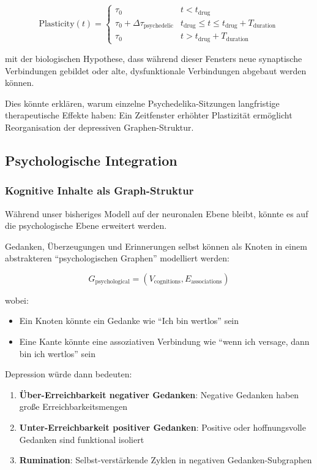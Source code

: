 \documentclass[a4paper,12pt]{article}
\theoremstyle{definition}
\begin{document}
\begin{equation}
\text{Plasticity}(t) = \begin{cases}
\tau_0 & t < t_{\text{drug}} \\
\tau_0 + \Delta \tau_{\text{psychedelic}} & t_{\text{drug}} \leq t \leq t_{\text{drug}} + T_{\text{duration}} \\
\tau_0 & t > t_{\text{drug}} + T_{\text{duration}}
\end{cases}
\end{equation}

mit der biologischen Hypothese, dass während dieser Fensters neue synaptische Verbindungen gebildet oder alte, dysfunktionale Verbindungen abgebaut werden können.

Dies könnte erklären, warum einzelne Psychedelika-Sitzungen langfristige therapeutische Effekte haben: Ein Zeitfenster erhöhter Plastizität ermöglicht Reorganisation der depressiven Graphen-Struktur.

\subsection{Psychologische Integration}

\subsubsection{Kognitive Inhalte als Graph-Struktur}

Während unser bisheriges Modell auf der neuronalen Ebene bleibt, könnte es auf die psychologische Ebene erweitert werden.

Gedanken, Überzeugungen und Erinnerungen selbst können als Knoten in einem abstrakteren ``psychologischen Graphen'' modelliert werden:

\begin{equation}
G_{\text{psychological}} = (V_{\text{cognitions}}, E_{\text{associations}})
\end{equation}

wobei:
\begin{itemize}
	\item Ein Knoten könnte ein Gedanke wie ``Ich bin wertlos'' sein
	\item Eine Kante könnte eine assoziativen Verbindung wie ``wenn ich versage, dann bin ich wertlos'' sein
\end{itemize}

Depression würde dann bedeuten:
\begin{enumerate}
	\item \textbf{Über-Erreichbarkeit negativer Gedanken}: Negative Gedanken haben große Erreichbarkeitsmengen
	\item \textbf{Unter-Erreichbarkeit positiver Gedanken}: Positive oder hoffnungsvolle Gedanken sind funktional isoliert
	\item \textbf{Rumination}: Selbst-verstärkende Zyklen in negativen Gedanken-Subgraphen
\end{enumerate}
\end{document}
